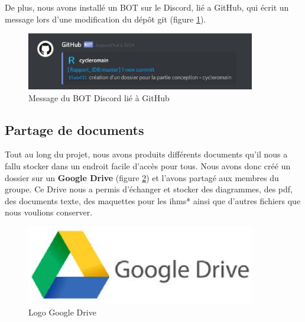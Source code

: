 De plus, nous avons installé un BOT sur le Discord, lié a GitHub, qui écrit un message lors d'une modification du dép\^ot git (figure \ref{bot_discord}).

\begin{figure}[!h]
\centering
\includegraphics[width=10cm]{./images/activite/bot_discord.eps}
\caption{Message du BOT Discord lié à GitHub}
\label{bot_discord}
\end{figure}



\subsection{Partage de documents}
Tout au long du projet, nous avons produits différents documents qu'il nous a fallu stocker dans un endroit facile d'accès pour tous. Nous avons donc créé un dossier sur un \textbf{Google Drive} (figure \ref{googledrive_logo}) et l'avons partagé aux membres du groupe. Ce Drive nous a permis d'échanger et stocker des diagrammes, des pdf, des documents texte, des maquettes pour les \glspl{ihm}* ainsi que d'autres fichiers que nous voulions conserver.

\begin{figure}[!h]
\centering
\includegraphics[width=10cm]{./images/activite/googleDriveLogo.eps}
\caption{Logo Google Drive}
\label{googledrive_logo}
\end{figure}



